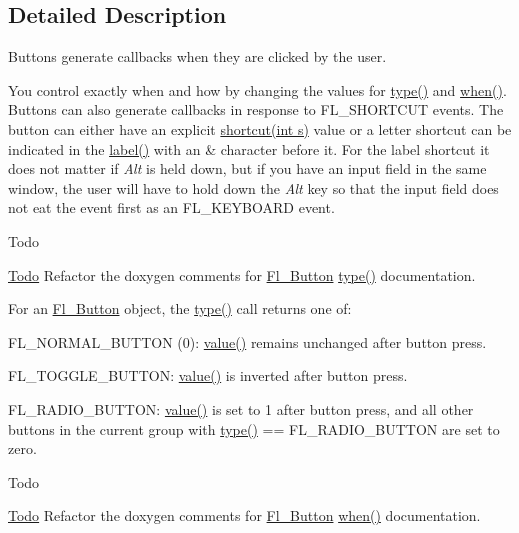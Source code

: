 \subsection{Detailed Description}
Buttons generate callbacks when they are clicked by the user. 

You control exactly when and how by changing the values for \hyperlink{class_fl___widget_adda2e8f162b3ea0332eb8d762350bbd5}{type()} and \hyperlink{class_fl___widget_ad4ef380ffb50f4d00fe93f7b6677e9e1}{when()}. Buttons can also generate callbacks in response to {\ttfamily F\+L\+\_\+\+S\+H\+O\+R\+T\+C\+UT} events. The button can either have an explicit \hyperlink{class_fl___button_ad0c694762b456cbb3c42927b2129fdd4}{shortcut(int s)} value or a letter shortcut can be indicated in the \hyperlink{class_fl___widget_aa327c70689110677d96067da55e227aa}{label()} with an \textquotesingle{}\&\textquotesingle{} character before it. For the label shortcut it does not matter if {\itshape Alt} is held down, but if you have an input field in the same window, the user will have to hold down the {\itshape Alt} key so that the input field does not eat the event first as an {\ttfamily F\+L\+\_\+\+K\+E\+Y\+B\+O\+A\+RD} event.

\begin{DoxyRefDesc}{Todo}
\item[\hyperlink{todo__todo000008}{Todo}]Refactor the doxygen comments for \hyperlink{class_fl___button}{Fl\+\_\+\+Button} \hyperlink{class_fl___widget_adda2e8f162b3ea0332eb8d762350bbd5}{type()} documentation.\end{DoxyRefDesc}


For an \hyperlink{class_fl___button}{Fl\+\_\+\+Button} object, the \hyperlink{class_fl___widget_adda2e8f162b3ea0332eb8d762350bbd5}{type()} call returns one of\+: \begin{DoxyItemize}
\item {\ttfamily F\+L\+\_\+\+N\+O\+R\+M\+A\+L\+\_\+\+B\+U\+T\+T\+ON} (0)\+: \hyperlink{class_fl___button_aceffc03f6b14f180a1639e26c91f9a4a}{value()} remains unchanged after button press. \item {\ttfamily F\+L\+\_\+\+T\+O\+G\+G\+L\+E\+\_\+\+B\+U\+T\+T\+ON\+:} \hyperlink{class_fl___button_aceffc03f6b14f180a1639e26c91f9a4a}{value()} is inverted after button press. \item {\ttfamily F\+L\+\_\+\+R\+A\+D\+I\+O\+\_\+\+B\+U\+T\+T\+ON\+:} \hyperlink{class_fl___button_aceffc03f6b14f180a1639e26c91f9a4a}{value()} is set to 1 after button press, and all other buttons in the current group with {\ttfamily \hyperlink{class_fl___widget_adda2e8f162b3ea0332eb8d762350bbd5}{type()} == F\+L\+\_\+\+R\+A\+D\+I\+O\+\_\+\+B\+U\+T\+T\+ON} are set to zero.\end{DoxyItemize}
\begin{DoxyRefDesc}{Todo}
\item[\hyperlink{todo__todo000009}{Todo}]Refactor the doxygen comments for \hyperlink{class_fl___button}{Fl\+\_\+\+Button} \hyperlink{class_fl___widget_ad4ef380ffb50f4d00fe93f7b6677e9e1}{when()} documentation.\end{DoxyRefDesc}


